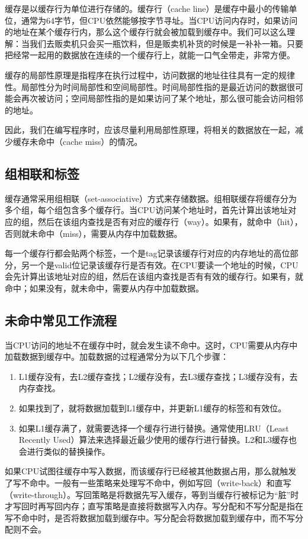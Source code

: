 \documentclass[../main.tex]{subfiles}
\begin{document}
缓存是以缓存行为单位进行存储的。缓存行（cache line）是缓存中最小的传输单位，通常为64字节，但CPU依然能够按字节寻址。当CPU访问内存时，如果访问的地址在某个缓存行内，那么这个缓存行就会被加载到缓存中。我们可以这么理解：当我们去贩卖机只会买一瓶饮料，但是贩卖机补货的时候是一补补一箱。只要把经常一起用的数据放在连续的一个缓存行上，就能一口气全带走，非常方便。

缓存的局部性原理是指程序在执行过程中，访问数据的地址往往具有一定的规律性。局部性分为时间局部性和空间局部性。时间局部性指的是最近访问的数据很可能会再次被访问；空间局部性指的是如果访问了某个地址，那么很可能会访问相邻的地址。

因此，我们在编写程序时，应该尽量利用局部性原理，将相关的数据放在一起，减少缓存未命中（cache miss）的情况。

\subsection{组相联和标签}

缓存通常采用组相联（set-associative）方式来存储数据。组相联缓存将缓存分为多个组，每个组包含多个缓存行。当CPU访问某个地址时，首先计算出该地址对应的组，然后在该组内查找是否有对应的缓存行（way）。如果有，就命中（hit），否则就未命中（miss），需要从内存中加载数据。

每一个缓存行都会贴两个标签，一个是tag记录该缓存行对应的内存地址的高位部分，另一个是valid位记录该缓存行是否有效。在CPU要读一个地址的时候，CPU会先计算出该地址对应的组，然后在该组内查找是否有有效的缓存行。如果有，就命中；如果没有，就未命中，需要从内存中加载数据。

\subsection{未命中常见工作流程}

当CPU访问的地址不在缓存中时，就会发生读不命中。这时，CPU需要从内存中加载数据到缓存中。加载数据的过程通常分为以下几个步骤：
\begin{enumerate}
  \item L1缓存没有，去L2缓存查找；L2缓存没有，去L3缓存查找；L3缓存没有，去内存查找。
  \item 如果找到了，就将数据加载到L1缓存中，并更新L1缓存的标签和有效位。
  \item 如果L1缓存满了，就需要选择一个缓存行进行替换。通常使用LRU（Least Recently Used）算法来选择最近最少使用的缓存行进行替换。L2和L3缓存也会进行类似的替换操作。
\end{enumerate}

如果CPU试图往缓存中写入数据，而该缓存行已经被其他数据占用，那么就触发了写不命中。一般有一些策略来处理写不命中，例如写回（write-back）和直写（write-through）。写回策略是将数据先写入缓存，等到当缓存行被标记为“脏”时才写回时再写回内存；直写策略是直接将数据写入内存。写分配和不写分配是指在写不命中时，是否将数据加载到缓存中。写分配会将数据加载到缓存中，而不写分配则不会。
\end{document}
